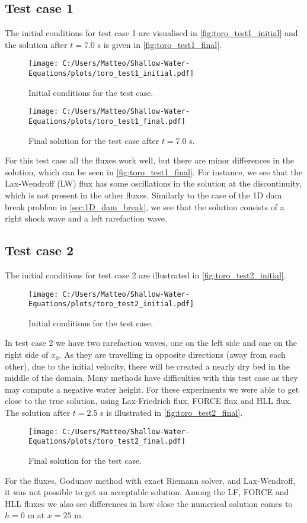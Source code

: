 \subsection*{Test case 1}
The initial conditions for test case 1 are visualised in \autoref{fig:toro_test1_initial} and the solution after $t=7.0$ s is given in \autoref{fig:toro_test1_final}.
\begin{figure}[H]
    \centering
    \texttt{[image: C:/Users/Matteo/Shallow-Water-Equations/plots/toro\_test1\_initial.pdf]}
    \caption{Initial conditions for the test case.}\label{fig:toro_test1_initial}
\end{figure}
\begin{figure}[H]
    \centering
    \texttt{[image: C:/Users/Matteo/Shallow-Water-Equations/plots/toro\_test1\_final.pdf]}
    \caption{Final solution for the test case after $t=7.0$ s.}\label{fig:toro_test1_final}
\end{figure}
For this test case all the fluxes work well, but there are minor differences in the solution, which can be seen in \autoref{fig:toro_test1_final}.
For instance, we see that the Lax-Wendroff (LW) flux has some oscillations in the solution at the discontinuity, which is not present in the other fluxes.
Similarly to the case of the 1D dam break problem in \autoref{sec:1D_dam_break}, we see that the solution consists of a right shock wave and a left rarefaction wave.

\newpage
\subsection*{Test case 2}
The initial conditions for test case 2 are illustrated in \autoref{fig:toro_test2_initial}.
\begin{figure}[H]
    \centering
    \texttt{[image: C:/Users/Matteo/Shallow-Water-Equations/plots/toro\_test2\_initial.pdf]}
    \caption{Initial conditions for the test case.}\label{fig:toro_test2_initial}
\end{figure}
In test case 2 we have two rarefaction waves, one on the left side and one on the right side of $x_0$.
As they are travelling in opposite directions (away from each other), due to the initial velocity, there will be created a nearly dry bed in the middle of the domain.
Many methods have difficulties with this test case as they may compute a negative water height.
For these experiments we were able to get close to the true solution, using Lax-Friedrich flux, FORCE flux and HLL flux.
The solution after $t=2.5$ s is illustrated in \autoref{fig:toro_test2_final}.
\begin{figure}[H]
    \centering
    \texttt{[image: C:/Users/Matteo/Shallow-Water-Equations/plots/toro\_test2\_final.pdf]}
    \caption{Final solution for the test case.}\label{fig:toro_test2_final}
\end{figure}
For the fluxes, Godunov method with exact Riemann solver, and Lax-Wendroff, it was not possible to get an acceptable solution.
Among the LF, FORCE and HLL fluxes we also see differences in how close the numerical solution comes to $h = 0$ m at $x = 25$ m.

